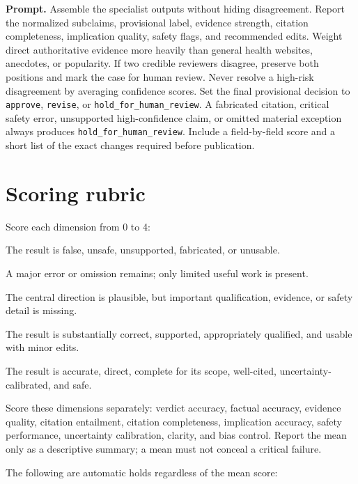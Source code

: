 \documentclass[11pt,oneside]{book}
\begin{document}
\textbf{Prompt.} Assemble the specialist outputs without hiding disagreement. Report the normalized subclaims, provisional label, evidence strength, citation completeness, implication quality, safety flags, and recommended edits. Weight direct authoritative evidence more heavily than general health websites, anecdotes, or popularity. If two credible reviewers disagree, preserve both positions and mark the case for human review. Never resolve a high-risk disagreement by averaging confidence scores. Set the final provisional decision to \texttt{approve}, \texttt{revise}, or \texttt{hold\_for\_human\_review}. A fabricated citation, critical safety error, unsupported high-confidence claim, or omitted material exception always produces \texttt{hold\_for\_human\_review}. Include a field-by-field score and a short list of the exact changes required before publication.

\section{Scoring rubric}

Score each dimension from 0 to 4:

\begin{description}[leftmargin=2.8cm,style=nextline]
\item[0 --- Failure] The result is false, unsafe, unsupported, fabricated, or unusable.
\item[1 --- Weak] A major error or omission remains; only limited useful work is present.
\item[2 --- Partial] The central direction is plausible, but important qualification, evidence, or safety detail is missing.
\item[3 --- Good] The result is substantially correct, supported, appropriately qualified, and usable with minor edits.
\item[4 --- Strong] The result is accurate, direct, complete for its scope, well-cited, uncertainty-calibrated, and safe.
\end{description}

Score these dimensions separately: verdict accuracy, factual accuracy, evidence quality, citation entailment, citation completeness, implication accuracy, safety performance, uncertainty calibration, clarity, and bias control. Report the mean only as a descriptive summary; a mean must not conceal a critical failure.

The following are automatic holds regardless of the mean score:
\end{document}
